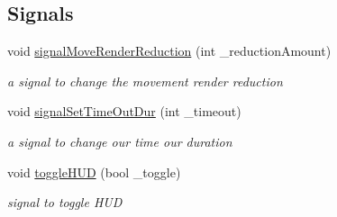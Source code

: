 \subsection*{Signals}
\begin{DoxyCompactItemize}
\item 
\hypertarget{class_gen_set_dock_widget_abe2429dbc481993e9b2898825db10681}{void \hyperlink{class_gen_set_dock_widget_abe2429dbc481993e9b2898825db10681}{signal\-Move\-Render\-Reduction} (int \-\_\-reduction\-Amount)}\label{class_gen_set_dock_widget_abe2429dbc481993e9b2898825db10681}

\begin{DoxyCompactList}\small\item\em a signal to change the movement render reduction \end{DoxyCompactList}\item 
\hypertarget{class_gen_set_dock_widget_ab8453a51013749869de98a5f4e863e2c}{void \hyperlink{class_gen_set_dock_widget_ab8453a51013749869de98a5f4e863e2c}{signal\-Set\-Time\-Out\-Dur} (int \-\_\-timeout)}\label{class_gen_set_dock_widget_ab8453a51013749869de98a5f4e863e2c}

\begin{DoxyCompactList}\small\item\em a signal to change our time our duration \end{DoxyCompactList}\item 
\hypertarget{class_gen_set_dock_widget_a6b8f743a49dbb2a6d624668cddfd58c5}{void \hyperlink{class_gen_set_dock_widget_a6b8f743a49dbb2a6d624668cddfd58c5}{toggle\-H\-U\-D} (bool \-\_\-toggle)}\label{class_gen_set_dock_widget_a6b8f743a49dbb2a6d624668cddfd58c5}

\begin{DoxyCompactList}\small\item\em signal to toggle H\-U\-D \end{DoxyCompactList}\end{DoxyCompactItemize}
